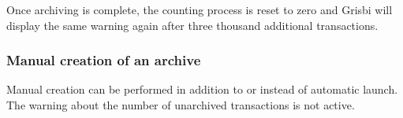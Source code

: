 Once archiving is complete, the counting process is reset to zero and Grisbi will display the same warning again after three thousand additional transactions.


\subsubsection{Manual creation of an archive\label{datamanagement-archive-manu}}%

Manual creation can be performed in addition to or instead of automatic launch. The warning about the number of unarchived transactions is not active.

